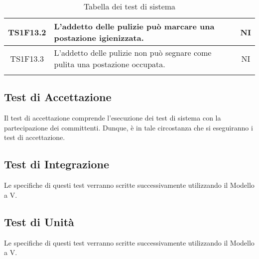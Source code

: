 \begin{center}
\begin{longtable}{|c|p{10cm}|c|}
			\hline
			TS1F13.2 & L'addetto delle pulizie può marcare una postazione igienizzata. & NI \\	
			\hline
			TS1F13.3 & L'addetto delle pulizie non può segnare come pulita una postazione occupata. & NI \\	
			\hline
			\hiderowcolors
			\caption{Tabella dei test di sistema}		
		\end{longtable}	
	\end{center}

	\subsection{Test di Accettazione}
	Il test di accettazione comprende l'esecuzione dei test di sistema con la partecipazione dei committenti. Dunque, è in tale circostanza che si eseguiranno i test di accettazione. 
	\subsection{Test di Integrazione}
	Le specifiche di questi test verranno scritte successivamente utilizzando il Modello a V.
	\subsection{Test di Unità}
	Le specifiche di questi test verranno scritte successivamente utilizzando il Modello a V.